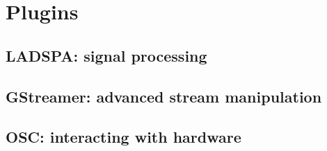 \chapter{Plugins}
\section{LADSPA: signal processing}

\section{GStreamer: advanced stream manipulation}

\section{OSC: interacting with hardware}
